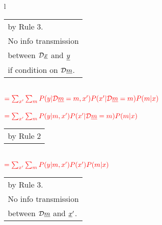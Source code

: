 \begin{longtable}{l}
\begin{tabular}{l}
\\
by Rule 3.\\
No info transmission\\
between ${\cal D}{\underline{x}}$ and ${\underline{y}}$\\
if condition on ${\cal D} {\underline{m}}$.
\end{tabular}
\\
$\color{red}=
\sum_{x'}
\sum_m
P(y|{\cal D}{\underline{m}}=m, x')
P(x'|{\cal D}{\underline{m}}=m)
P(m|x)$
\\
\\
$\color{red}=
\sum_{x'}
\sum_m
P(y|m, x')
P(x'|{\cal D}{\underline{m}}=m)
P(m|x)$
\\
\begin{tabular}{l}
\\
by Rule 2
\end{tabular}
\\
$\color{red}=
\sum_{x'}
\sum_m
P(y|m, x')
P(x')
P(m|x)$
\\
\xymatrix{\\=}
\begin{tabular}{l}
\\
by Rule 3.
\\
No info transmission\\
between ${\cal D}{\underline{m}}$ and ${\underline{x}}'$.
\end{tabular}
\end{longtable}



